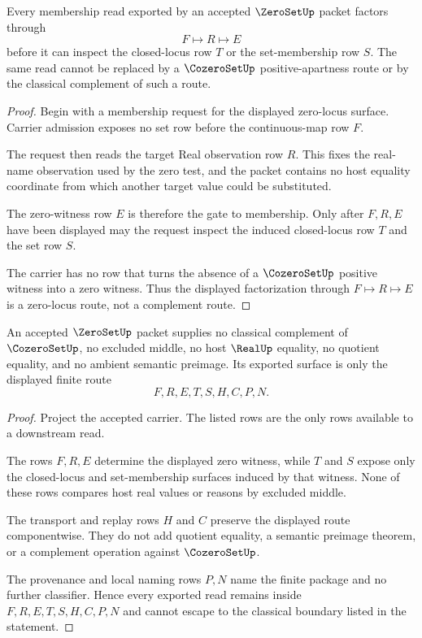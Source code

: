 \begin{theorem}
\label{thm:zero-set-positive-boundary}
Every membership read exported by an accepted $\ZeroSetUp$ packet factors through
$$
F \longmapsto R \longmapsto E
$$
before it can inspect the closed-locus row $T$ or the set-membership row $S$. The same read cannot be replaced by a $\CozeroSetUp$ positive-apartness route or by the classical complement of such a route.
\end{theorem}
\begin{proof}
Begin with a membership request for the displayed zero-locus surface. Carrier admission exposes no set row before the continuous-map row $F$.

The request then reads the target Real observation row $R$. This fixes the real-name observation used by the zero test, and the packet contains no host equality coordinate from which another target value could be substituted.

The zero-witness row $E$ is therefore the gate to membership. Only after $F,R,E$ have been displayed may the request inspect the induced closed-locus row $T$ and the set row $S$.

The carrier has no row that turns the absence of a $\CozeroSetUp$ positive witness into a zero witness. Thus the displayed factorization through $F \longmapsto R \longmapsto E$ is a zero-locus route, not a complement route.
\end{proof}

\begin{theorem}
\label{thm:zero-set-nonclassical-boundary}
An accepted $\ZeroSetUp$ packet supplies no classical complement of $\CozeroSetUp$, no excluded middle, no host $\RealUp$ equality, no quotient equality, and no ambient semantic preimage. Its exported surface is only the displayed finite route
$$
F,R,E,T,S,H,C,P,N.
$$
\end{theorem}
\begin{proof}
Project the accepted carrier. The listed rows are the only rows available to a downstream read.

The rows $F,R,E$ determine the displayed zero witness, while $T$ and $S$ expose only the closed-locus and set-membership surfaces induced by that witness. None of these rows compares host real values or reasons by excluded middle.

The transport and replay rows $H$ and $C$ preserve the displayed route componentwise. They do not add quotient equality, a semantic preimage theorem, or a complement operation against $\CozeroSetUp$.

The provenance and local naming rows $P,N$ name the finite package and no further classifier. Hence every exported read remains inside $F,R,E,T,S,H,C,P,N$ and cannot escape to the classical boundary listed in the statement.
\end{proof}

